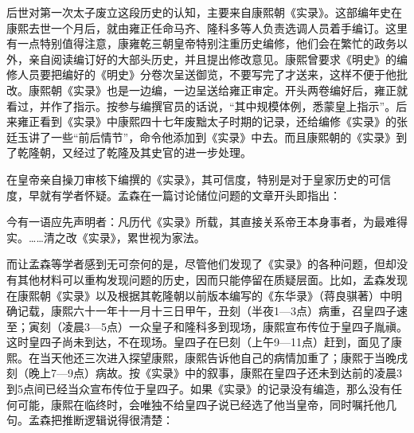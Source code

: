 
后世对第一次太子废立这段历史的认知，主要来自康熙朝《实录》。这部编年史在康熙去世一个月后，就由雍正任命马齐、隆科多等人负责选调人员着手编订。这里有一点特别值得注意，康雍乾三朝皇帝特别注重历史编修，他们会在繁忙的政务以外，亲自阅读编订好的大部头历史，并且提出修改意见。康熙曾要求《明史》的编修人员要把编好的《明史》分卷次呈送御览，不要写完了才送来，这样不便于他批改。康熙朝《实录》也是一边编，一边呈送给雍正审定。开头两卷编好后，雍正就看过，并作了指示。按参与编撰官员的话说，“其中规模体例，悉蒙皇上指示”。后来雍正看到《实录》中康熙四十七年废黜太子时期的记录，还给编修《实录》的张廷玉讲了一些“前后情节”，命令他添加到《实录》中去。而且康熙朝的《实录》到了乾隆朝，又经过了乾隆及其史官的进一步处理。



在皇帝亲自操刀审核下编撰的《实录》，其可信度，特别是对于皇家历史的可信度，早就有学者怀疑。孟森在一篇讨论储位问题的文章开头即指出：



\begin{bookquote}今有一语应先声明者：凡历代《实录》所载，其直接关系帝王本身事者，为最难得实。……清之改《实录》，累世视为家法。\end{bookquote}

而让孟森等学者感到无可奈何的是，尽管他们发现了《实录》的各种问题，但却没有其他材料可以重构发现问题的历史，因而只能停留在质疑层面。比如，孟森发现在康熙朝《实录》以及根据其乾隆朝以前版本编写的《东华录》（蒋良骐著）中明确记载，康熙六十一年十一月十三日甲午，丑刻（半夜1—3点）病重，召皇四子速至；寅刻（凌晨3—5点）一众皇子和隆科多到现场，康熙宣布传位于皇四子胤禛。这时皇四子尚未到达，不在现场。皇四子在巳刻（上午9—11点）赶到，面见了康熙。在当天他还三次进入探望康熙，康熙告诉他自己的病情加重了；康熙于当晚戌刻（晚上7—9点）病故。按《实录》中的叙事，康熙在皇四子还未到达前的凌晨3到5点间已经当众宣布传位于皇四子。如果《实录》的记录没有编造，那么没有任何可能，康熙在临终时，会唯独不给皇四子说已经选了他当皇帝，同时嘱托他几句。孟森把推断逻辑说得很清楚：



